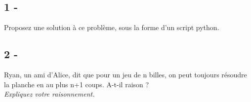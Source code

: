 \documentclass{article}
\begin{document}
        \subsection*{1 -}
            \textsf{Proposez une solution à ce problème, sous la forme d'un script python.}\\
        \subsection*{2 -}
            \textsf{Ryan, un ami d'Alice, dit que pour un jeu de n billes, on peut toujours résoudre la planche en au plus n+1 coups. A-t-il raison ?}\\
            \textit{Expliquez votre raisonnement.}
\end{document}
